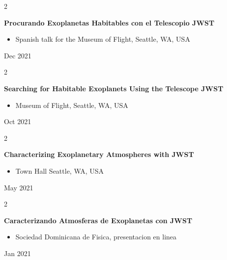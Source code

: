 \documentclass[10pt, letterpaper]{article}
\newenvironment{highlights}{
    \begin{itemize}[
        topsep=0.10 cm,
        parsep=0.10 cm,
        partopsep=0pt,
        itemsep=0pt,
        leftmargin=0.4 cm + 10pt
    ]
}{
    \end{itemize}
} %
\newenvironment{twocolentry}[2][]{
    \onecolentry
    \def\secondColumn{#2}
    \setcolumnwidth{\fill, 4.5 cm}
    \begin{paracol}{2}
}{
    \switchcolumn \raggedleft \secondColumn
    \end{paracol}
    \endonecolentry
} %
\begin{document}
        \vspace{0.2 cm}

        \begin{twocolentry}{
            Dec 2021
        }
            \textbf{Procurando Exoplanetas Habitables con el Telescopio JWST}
            \begin{highlights}
                \item Spanish talk for the Museum of Flight, Seattle, WA, USA
            \end{highlights}
        \end{twocolentry}


        \vspace{0.2 cm}

        \begin{twocolentry}{
            Oct 2021
        }
            \textbf{Searching for Habitable Exoplanets Using the Telescope JWST}
            \begin{highlights}
                \item Museum of Flight, Seattle, WA, USA
            \end{highlights}
        \end{twocolentry}


        \vspace{0.2 cm}

        \begin{twocolentry}{
            May 2021
        }
            \textbf{Characterizing Exoplanetary Atmospheres with JWST}
            \begin{highlights}
                \item Town Hall Seattle, WA, USA
            \end{highlights}
        \end{twocolentry}


        \vspace{0.2 cm}

        \begin{twocolentry}{
            Jan 2021
        }
            \textbf{Caracterizando Atmosferas de Exoplanetas con JWST}
            \begin{highlights}
                \item Sociedad Dominicana de Fisica, presentacion en linea
            \end{highlights}
        \end{twocolentry}


        \vspace{0.2 cm}
\end{document}
